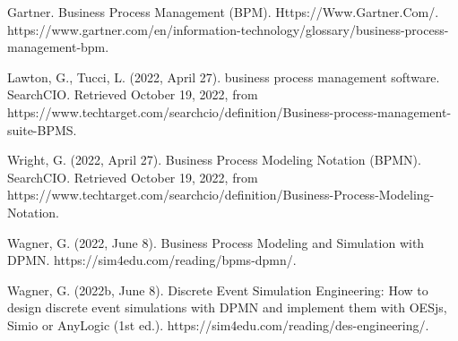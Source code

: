 \documentclass{article}
\begin{document}
\begin{thebibliography}{99} %

Gartner. Business Process Management (BPM). Https://Www.Gartner.Com/. https://www.gartner.com/en/information-technology/glossary/business-process-management-bpm.

Lawton, G., Tucci, L. (2022, April 27). business process management software. SearchCIO. Retrieved October 19, 2022, from https://www.techtarget.com/searchcio/definition/Business-process-management-suite-BPMS.

Wright, G. (2022, April 27). Business Process Modeling Notation (BPMN). SearchCIO. Retrieved October 19, 2022, from https://www.techtarget.com/searchcio/definition/Business-Process-Modeling-Notation.

Wagner, G. (2022, June 8). Business Process Modeling and Simulation with DPMN. https://sim4edu.com/reading/bpms-dpmn/.

Wagner, G. (2022b, June 8). Discrete Event Simulation Engineering: How to design discrete event simulations with DPMN and implement them with OESjs, Simio or AnyLogic (1st ed.). https://sim4edu.com/reading/des-engineering/.



 
\end{thebibliography}

\end{document}
